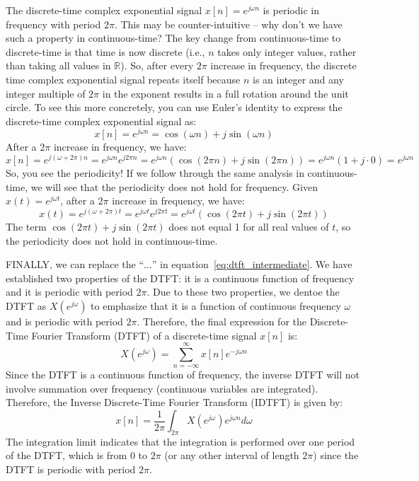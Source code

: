The discrete-time complex exponential signal \( x[n] = e^{j \omega n} \) is periodic in frequency with period \( 2\pi \). This may be counter-intuitive -- why don't we have such a property in continuous-time? The key change from continuous-time to discrete-time is that time is now discrete (i.e., $n$ takes only integer values, rather than taking all values in $\mathbb{R}$). So, after every $2\pi$ increase in frequency, the discrete time complex exponential signal repeats itself because $n$ is an integer and any integer multiple of $2\pi$ in the exponent results in a full rotation around the unit circle. To see this more concretely, you can use Euler's identity to express the discrete-time complex exponential signal as:
\[
x[n] = e^{j \omega n} = \cos(\omega n) + j \sin(\omega n)
\]
After a $2\pi$ increase in frequency, we have:
\[
x[n] = e^{j (\omega + 2\pi) n} = e^{j \omega n} e^{j 2\pi n} = e^{j \omega n} (\cos(2\pi n) + j \sin(2\pi n)) = e^{j \omega n} (1 + j \cdot 0) = e^{j \omega n}
\]
So, you see the periodicity! If we follow through the same analysis in continuous-time, we will see that the periodicity does not hold for frequency. Given $x(t) = e^{j \omega t}$, after a $2\pi$ increase in frequency, we have:
\[
x(t) = e^{j (\omega + 2\pi) t} = e^{j \omega t} e^{j 2\pi t} = e^{j \omega t} (\cos(2\pi t) + j \sin(2\pi t))
\]
The term $\cos(2\pi t) + j \sin(2\pi t)$ does not equal 1 for all real values of \( t \), so the periodicity does not hold in continuous-time.

FINALLY, we can replace the ``$\dots$'' in equation~\eqref{eq:dtft_intermediate}. We have established two properties of the DTFT: it is a continuous function of frequency and it is periodic with period \( 2\pi \). Due to these two properties, we dentoe the DTFT as \( X(e^{j \omega}) \) to emphasize that it is a function of continuous frequency \( \omega \) and is periodic with period \( 2\pi \). Therefore, the final expression for the Discrete-Time Fourier Transform (DTFT) of a discrete-time signal \( x[n] \) is:
\begin{equation}
    \label{eq:dtft_final}
    X(e^{j \omega}) = \sum_{n=-\infty}^{\infty} x[n] e^{-j \omega n}
\end{equation}
Since the DTFT is a continuous function of frequency, the inverse DTFT will not involve summation over frequency (continuous variables are integrated). Therefore, the Inverse Discrete-Time Fourier Transform (IDTFT) is given by:
\begin{equation}
    \label{eq:idtft}
    x[n] = \frac{1}{2\pi} \int_{2\pi} X(e^{j \omega}) e^{j \omega n} d\omega
\end{equation}
The integration limit indicates that the integration is performed over one period of the DTFT, which is from \( 0 \) to \( 2\pi \) (or any other interval of length \( 2\pi \)) since the DTFT is periodic with period \( 2\pi \).


